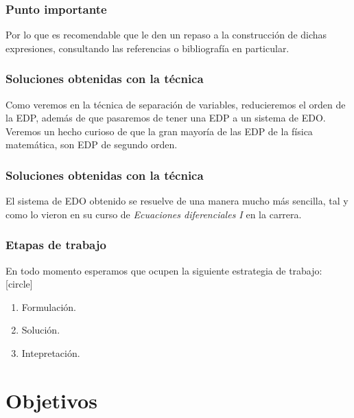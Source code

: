 \documentclass[12pt]{beamer}
\begin{document}
\begin{frame}
\frametitle{Punto importante}
Por lo que es recomendable que le den un repaso a la construcción de dichas expresiones, consultando las referencias o bibliografía en particular.
\end{frame}
\begin{frame}
\frametitle{Soluciones obtenidas con la técnica}
Como veremos en la técnica de separación de variables, reducieremos el orden de la EDP, además de que pasaremos de tener una EDP a un sistema de EDO.
\\
\bigskip
Veremos un hecho curioso de que la gran mayoría de las EDP de la física matemática, son EDP de segundo orden.
\end{frame}
\begin{frame}
\frametitle{Soluciones obtenidas con la técnica}
El sistema de EDO obtenido se resuelve de una manera mucho más sencilla, tal y como lo vieron en su curso de \emph{Ecuaciones diferenciales I} en la carrera.
\end{frame}
\begin{frame}
\frametitle{Etapas de trabajo}
En todo momento esperamos que ocupen la siguiente estrategia de trabajo:
[circle]
\begin{enumerate}[<+->]
\item Formulación.
\item Solución.
\item Intepretación.
\end{enumerate}
\end{frame}
\section{Objetivos}
\end{document}
